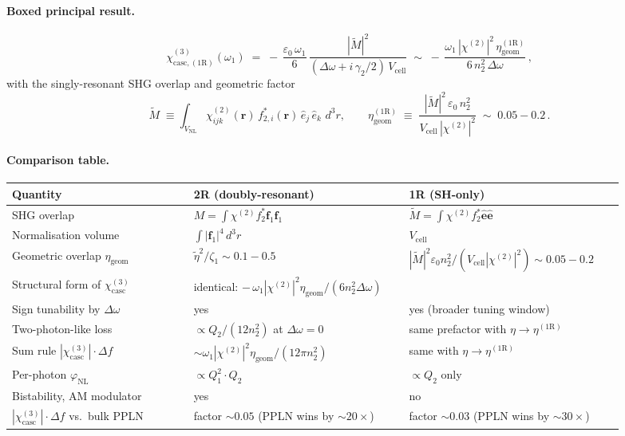 \documentclass[11pt,a4paper]{article}
\newcommand{\eps}{\varepsilon}
\newcommand{\bvec}[1]{\mathbf{#1}}
\newcommand{\f}{\bvec{f}}
\newcommand{\ri}{\bvec{r}}
\newcommand{\dthreer}{\,d^{3}r}
\newcommand{\chitwo}{\chi^{(2)}}
\newcommand{\Dom}{\Delta\omega}
\newcommand{\chicascOneR}{\chi^{(3)}_{\text{casc},(1\mathrm R)}}
\newcommand{\chicasc}{\chi^{(3)}_{\text{casc}}}
\newcommand{\Vunit}{V_{\text{cell}}}
\newcommand{\VNL}{V_{\text{NL}}}
\begin{document}
\paragraph{Boxed principal result.}
\begin{equation*}
  \boxed{\;
   \chicascOneR(\omega_1)
    \;=\;-\,\frac{\eps_0\,\omega_1}{6}\,
         \frac{|\widetilde M|^{2}}{(\Dom+i\,\gamma_2/2)\,\Vunit}
    \;\sim\;-\,\frac{\omega_1\,|\chitwo|^{2}\,\eta_\text{geom}^{(1\mathrm R)}}
                    {6\,n_2^{2}\,\Dom}\,,
   \;}
\end{equation*}
with the singly-resonant SHG overlap and geometric factor
\begin{equation*}
  \widetilde M\;\equiv\!\int_{\VNL}\!\chitwo_{ijk}(\ri)\,f_{2,i}^{*}(\ri)\,
    \hat e_j\,\hat e_k\,\dthreer,
  \qquad
  \eta_\text{geom}^{(1\mathrm R)}\;\equiv\;\frac{|\widetilde M|^{2}\,\eps_0\,n_2^{2}}
                                          {\Vunit\,|\chitwo|^{2}}
  \;\sim\;0.05\!-\!0.2\,.
\end{equation*}

\paragraph{Comparison table.}
\begin{center}\small
\begin{tabular}{p{0.27\linewidth}p{0.32\linewidth}p{0.32\linewidth}}
  \toprule
  Quantity & 2R (doubly-resonant) & 1R (SH-only) \\
  \midrule
  SHG overlap
   & $M=\!\int\chitwo f_{2}^{*}\f_{1}\f_{1}$
   & $\widetilde M=\!\int\chitwo f_{2}^{*}\hat{\bm e}\hat{\bm e}$ \\[2pt]
  Normalisation volume
   & $\int|\f_1|^{4}\dthreer$
   & $\Vunit$ \\[2pt]
  Geometric overlap $\eta_\text{geom}$
   & $\widetilde\eta^{2}/\zeta_1\sim 0.1\!-\!0.5$
   & $|\widetilde M|^{2}\eps_0 n_2^{2}/(\Vunit|\chitwo|^{2})\sim 0.05\!-\!0.2$ \\[2pt]
  Structural form of $\chicasc$
   & \multicolumn{2}{p{0.66\linewidth}}{\quad identical: $-\,\omega_1|\chitwo|^{2}\eta_\text{geom}/(6 n_2^{2}\Dom)$} \\[2pt]
  Sign tunability by $\Dom$
   & yes
   & yes (broader tuning window) \\[2pt]
  Two-photon-like loss
   & $\propto Q_2/(12 n_2^{2})$ at $\Dom=0$
   & same prefactor with $\eta\to\eta^{(1\mathrm R)}$ \\[2pt]
  Sum rule $|\chicasc|\!\cdot\!\Delta f$
   & $\sim\omega_1|\chitwo|^{2}\eta_\text{geom}/(12\pi n_2^{2})$
   & same with $\eta\to\eta^{(1\mathrm R)}$ \\[2pt]
  Per-photon $\varphi_\text{NL}$
   & $\propto Q_1^{2}\cdot Q_2$
   & $\propto Q_2$ only \\[2pt]
  Bistability, AM modulator
   & yes
   & no \\[2pt]
  $|\chicasc|\!\cdot\!\Delta f$ vs.\ bulk PPLN
   & factor $\sim 0.05$ (PPLN wins by $\sim 20\times$)
   & factor $\sim 0.03$ (PPLN wins by $\sim 30\times$) \\
  \bottomrule
\end{tabular}
\end{center}
\end{document}

